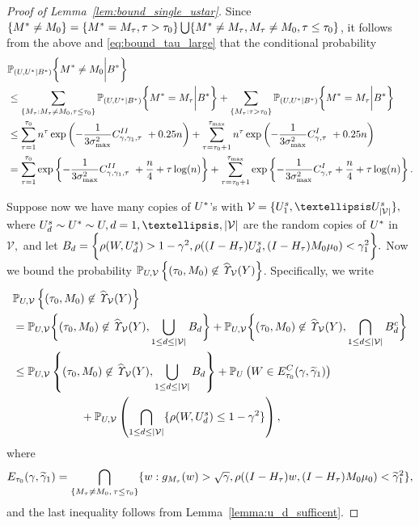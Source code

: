 \documentclass[10pt,a4paper]{amsart}
\def\P{\mathbb P}
\begin{document}
\begin{proof}[Proof of Lemma~\ref{lem:bound_single_ustar}]
Since $\{\*M^* \neq \*M_0\} =  \{\*M^* = \*M_\tau, \tau > \tau_0\}  \bigcup \{\*M^* \neq \*M_\tau, \*M_\tau \neq \*M_0, \tau \leq \tau_0\}$, it follows from the above and 
\eqref{eq:bound_tau_large}  that the conditional probability
\begin{align}\label{eq:aaa_1}
& \P_{(\*U, \*U^*|B^*)}\bigg\{{\*M}^* \neq \*M_0 \bigg|B^* \bigg\} \nonumber \\ 
& \leq \sum_{\{\*M_\tau: \*M_\tau \neq \*M_0, \tau \leq \tau_0\}}\P_{(\*U, \*U^*|B^*)}\bigg\{{\*M}^* = \*M_\tau \bigg| B^* \bigg\}\nonumber +  \sum_{\{\*M_\tau:  \tau > \tau_0\}}\P_{(\*U, \*U^*|B^*)}\bigg\{{\*M}^* = \*M_\tau \bigg |B^* \bigg\} \nonumber \\ 
&  \leq  \sum_{\tau=1}^{\tau_0} n^{\tau} \exp\left(-\frac{1}{3\sigma^2_{\max}}C^{II}_{\gamma, \gamma_1, \tau}\ + 0.25n \right) +  \sum_{\tau=\tau_0 + 1}^{\tau_{\max}} n^{\tau} \exp\left(-\frac{1}{3\sigma^2_{\max}}C^{I}_{\gamma,  \tau}\ + 0.25n \right) \nonumber\\
    & =  \sum_{\tau=1}^{\tau_0} \exp\left\{-\frac{1}{3\sigma^2_{\max}} C^{II}_{\gamma, \gamma_1, \tau}\ + \frac{n}4 + \tau\log(n)\right\} + \sum^{\tau_{\max}}_{\tau=\tau_0+1}
    \exp\left\{-\frac{1}{3\sigma^2_{\max}} C^I_{\gamma, \tau} + \frac{n}4 +  \tau\log(n) \right\}.
\end{align}

Suppose now we have many copies of $\*U^*$'s with
$\mathcal V   = \{\*U^s_1, \dots \*U^s_{|\mathcal V|}\},$ where $\*U^s_d \sim \*U^* \sim \*U, d= 1, \dots, |\mathcal V|$ are the random copies of $\*U^*$ in $\mathcal V,$ and let $B_d =  \bigg\{\rho(\*W, \*U^s_d) > 1-\gamma^2, \rho((\*I - \*H_\tau)\*U^s_d, (\*I - \*H_\tau)\*M_0\*\mu_0)<  \gamma_1^2\bigg\}.$ 
Now we bound the probability $\P_{\*U,\mathcal V  }\left\{(\tau_0, \*M_0) \not\in \widehat{\it \Upsilon}_{{\mathcal V}}(\*Y)\right\} $. Specifically, we  write
\begin{align} 
\label{eq:total_bound}
    &  \P_{\*U,\mathcal V  }\left\{(\tau_0, \*M_0) \not\in \widehat{\it \Upsilon}_{{\mathcal V}}(\*Y)\right\} \nonumber \\ & =  \P_{\*U,\mathcal V  }\bigg\{(\tau_0, \*M_0) \not\in \widehat{\it \Upsilon}_{{\mathcal V}}(\*Y), \bigcup_{1 \leq d \leq |\mathcal V|} B_d\bigg\}  +   \P_{\*U,\mathcal V  }\bigg\{(\tau_0, \*M_0) \not\in \widehat{\it \Upsilon}_{{\mathcal V}}(\*Y), \bigcap_{1 \leq d \leq |\mathcal V|}B_d^c \bigg\} \nonumber \\
    &  \leq \P_{\*U,\mathcal V  }\left\{(\tau_0, \*M_0) \not\in \widehat{\it \Upsilon}_{{\mathcal V}}(\*Y), \bigcup_{1 \leq d \leq |\mathcal V|}B_d\right\} + \P_{\*U}\left(\*W \in E^C_{\tau_0}(\gamma, \widetilde \gamma_1)\right) \nonumber \\ & \qquad  \qquad \qquad +  \P_{\*U,\mathcal V} \left(\bigcap_{1 \leq d \leq |\mathcal V|}\{\rho(\*W,\*U^s_d) \leq 1 - \gamma^2 \}\right),
\end{align}
where $$E_{\tau_0}(\gamma,\widetilde\gamma_1 ) = \bigcap_{\{\*M_\tau \neq \*M_0, \, \tau \leq \tau_0\}}\{\*w: g_{\*M_\tau}(\*w) > \sqrt{\gamma}, \rho((\*I - \*H_\tau)\*w, (\*I - \*H_\tau)\*M_0\*\mu_0)< \widetilde \gamma_1^2\},$$
and the last inequality follows from Lemma~\ref{lemma:u_d_sufficent}.



\end{proof}
\end{document}
